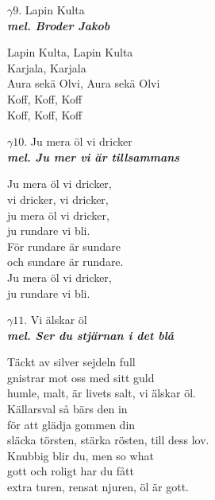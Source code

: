 \documentclass[a6paper,10pt]{article}
\newcommand{\mel}[1]{\small\textbf{\textit{mel. #1 \\}}}
\begin{document}
\setlength{\oddsidemargin}{-0.47in}
\begin{center}
\Large $\gamma9$. Lapin Kulta\\ 
\mel{Broder Jakob}
\end{center}
Lapin Kulta, Lapin Kulta\\
Karjala, Karjala\\
Aura sekä Olvi, Aura sekä Olvi\\
Koff, Koff, Koff\\
Koff, Koff, Koff
\begin{center}
\Large $\gamma10$. Ju mera öl vi dricker\\ 
\mel{Ju mer vi är tillsammans}
\end{center}
Ju mera öl vi dricker,\\
vi dricker, vi dricker,\\
ju mera öl vi dricker,\\
ju rundare vi bli.
\vspace{5pt} \\
För rundare är sundare\\
och sundare är rundare.\\
Ju mera öl vi dricker,\\
ju rundare vi bli.
\begin{center}
\Large $\gamma11$. Vi älskar öl \\ 
\mel{Ser du stjärnan i det blå}
\end{center}
Täckt av silver sejdeln full\\
gnistrar mot oss med sitt guld\\
humle, malt, är livets salt, vi älskar öl. 
\vspace{5pt}\\
Källarsval så bärs den in\\
för att glädja gommen din\\
släcka törsten, stärka rösten, till dess lov. 
\vspace{5pt}\\
Knubbig blir du, men so what\\
gott och roligt har du fått\\
extra turen, rensat njuren, öl är gott.
\end{document}
